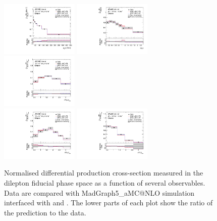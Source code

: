 \begin{figure}[ht]
  \centering
  \includegraphics[width=0.33\textwidth]{figures/diff_xsec/normalized-unfolded-distributions/tty_prod_dilep/DL_tty_prod_pt_unfolded_normalized.pdf}%
  \includegraphics[width=0.33\textwidth]{figures/diff_xsec/normalized-unfolded-distributions/tty_prod_dilep/DL_tty_prod_eta_unfolded_normalized.pdf}%
  \includegraphics[width=0.33\textwidth]{figures/diff_xsec/normalized-unfolded-distributions/tty_prod_dilep/DL_tty_prod_drphb_unfolded_normalized.pdf}\\
  \includegraphics[width=0.33\textwidth]{figures/diff_xsec/normalized-unfolded-distributions/tty_prod_dilep/DL_tty_prod_drphl_unfolded_normalized.pdf}%
  \includegraphics[width=0.33\textwidth]{figures/diff_xsec/normalized-unfolded-distributions/tty_prod_dilep/DL_tty_prod_drlj_unfolded_normalized.pdf}%
  \caption{Normalised differential \tty production cross-section measured in the dilepton fiducial phase space as a function of several observables. Data are compared with MadGraph5\_aMC@NLO simulation interfaced with \PYTHIA[8] and \HERWIG[7]. The lower parts of each plot show the ratio of the prediction to the data.}
  \label{fig:tty_prod_diff_DL1_norm}
\end{figure}
\FloatBarrier


